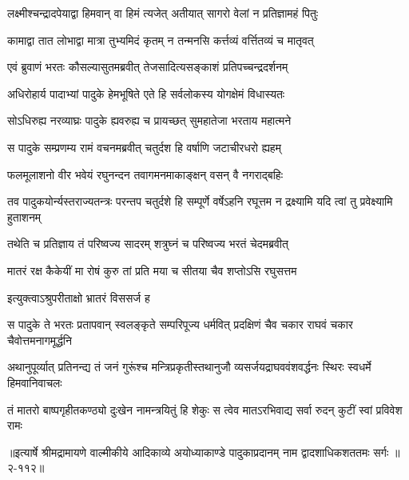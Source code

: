 \twolineshloka
{लक्ष्मीश्चन्द्रादपेयाद्वा हिमवान् वा हिमं त्यजेत्}
{अतीयात् सागरो वेलां न प्रतिज्ञामहं पितुः} %

\twolineshloka
{कामाद्वा तात लोभाद्वा मात्रा तुभ्यमिदं कृतम्}
{न तन्मनसि कर्त्तव्यं वर्त्तितव्यं च मातृवत्} %

\twolineshloka
{एवं ब्रुवाणं भरतः कौसल्यासुतमब्रवीत्}
{तेजसादित्यसङ्काशं प्रतिपच्चन्द्रदर्शनम्} %

\twolineshloka
{अधिरोहार्य पादाभ्यां पादुके हेमभूषिते}
{एते हि सर्वलोकस्य योगक्षेमं विधास्यतः} %

\twolineshloka
{सोऽधिरुह्य नरव्याघ्रः पादुके ह्यवरुह्य च}
{प्रायच्छत् सुमहातेजा भरताय महात्मने} %

\twolineshloka
{स पादुके सम्प्रणम्य रामं वचनमब्रवीत्}
{चतुर्दश हि वर्षाणि जटाचीरधरो ह्यहम्} %

\twolineshloka
{फलमूलाशनो वीर भवेयं रघुनन्दन}
{तवागमनमाकाङ्क्षन् वसन् वै नगराद्बहिः} %

\threelineshloka
{तव पादुकयोर्न्यस्तराज्यतन्त्रः परन्तप}
{चतुर्दशे हि सम्पूर्णे वर्षेऽहनि रघूत्तम}
{न द्रक्ष्यामि यदि त्वां तु प्रवेक्ष्यामि हुताशनम्} %

\twolineshloka
{तथेति च प्रतिज्ञाय तं परिष्वज्य सादरम्}
{शत्रुघ्नं च परिष्वज्य भरतं चेदमब्रवीत्} %

\twolineshloka
{मातरं रक्ष कैकेयीं मा रोषं कुरु तां प्रति}
{मया च सीतया चैव शप्तोऽसि रघुसत्तम} %

\onelineshloka
{इत्युक्त्वाऽश्रुपरीताक्षो भ्रातरं विससर्ज ह} %

\twolineshloka
{स पादुके ते भरतः प्रतापवान् स्वलङ्कृते सम्परिपूज्य धर्मवित्}
{प्रदक्षिणं चैव चकार राघवं चकार चैवोत्तमनागमूर्द्धनि} %

\twolineshloka
{अथानुपूर्व्यात् प्रतिनन्द्य तं जनं गुरूंश्च मन्त्रिप्रकृतीस्तथानुजौ}
{व्यसर्जयद्राघववंशवर्द्धनः स्थिरः स्वधर्मे हिमवानिवाचलः} %

\twolineshloka
{तं मातरो बाष्पगृहीतकण्ठ्यो दुःखेन नामन्त्रयितुं हि शेकुः}
{स त्वेव मातऽरभिवाद्य सर्वा रुदन् कुटीं स्वां प्रविवेश रामः} %


॥इत्यार्षे श्रीमद्रामायणे वाल्मीकीये आदिकाव्ये अयोध्याकाण्डे पादुकाप्रदानम् नाम द्वादशाधिकशततमः सर्गः ॥२-११२॥
